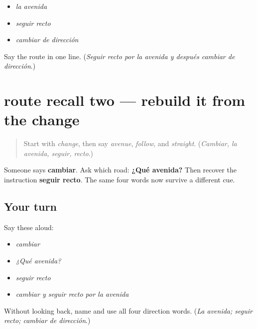 \begin{itemize}
\raggedright
  \item \emph{la avenida}
  \item \emph{seguir recto}
  \item \emph{cambiar de dirección}
\end{itemize}

\begin{tcolorbox}[breakable,colback=teal!4,colframe=teal!35!black,title={Before you move on}]
Say the route in one line. (\emph{Seguir recto por la avenida y después cambiar de dirección}.)
\end{tcolorbox}
\section[(review)]{route recall two — rebuild it from the change}

\label{lesson:ES-C401-route-recall-2}



\begin{quote}
Start with \emph{change}, then say \emph{avenue}, \emph{follow}, and \emph{straight}. (\emph{Cambiar, la avenida, seguir, recto}.)
\end{quote}

\begin{grammarlens}[title={What you've built}]
Someone says \textbf{cambiar}. Ask which road: \textbf{¿Qué avenida?} Then recover the instruction \textbf{seguir recto}. The same four words now survive a different cue.
\end{grammarlens}

\subsection*{Your turn}
Say these aloud:

\begin{itemize}
\raggedright
  \item \emph{cambiar}
  \item \emph{¿Qué avenida?}
  \item \emph{seguir recto}
  \item \emph{cambiar y seguir recto por la avenida}
\end{itemize}

\begin{tcolorbox}[breakable,colback=teal!4,colframe=teal!35!black,title={Before you move on}]
Without looking back, name and use all four direction words. (\emph{La avenida; seguir recto; cambiar de dirección}.)
\end{tcolorbox}

